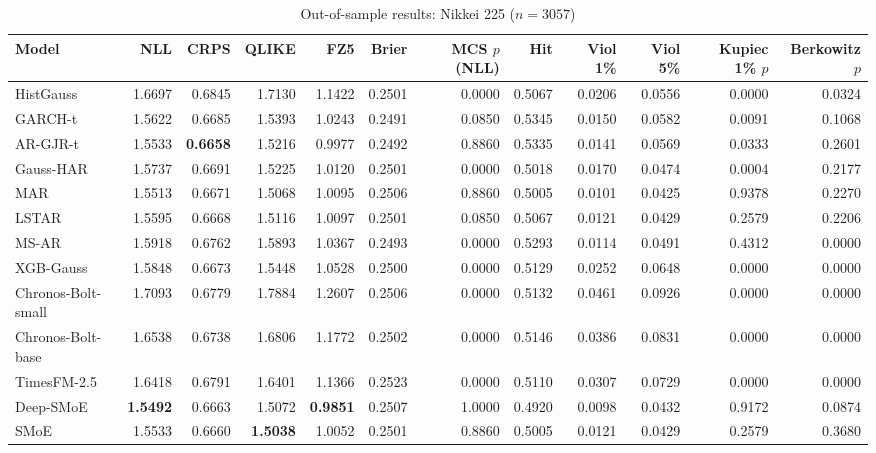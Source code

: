 \begin{table}[!htbp]\centering\scriptsize
\caption{Out-of-sample results: Nikkei 225 ($n=3057$)}\label{tab:asset_n225}
\begin{adjustbox}{max width=\textwidth}
\begin{tabular}{lrrrrrrrrrrr}
\toprule
Model & NLL & CRPS & QLIKE & FZ5 & Brier & MCS $p$ (NLL) & Hit & Viol 1\% & Viol 5\% & Kupiec 1\% $p$ & Berkowitz $p$\\
\midrule
HistGauss & 1.6697 & 0.6845 & 1.7130 & 1.1422 & 0.2501 & 0.0000 & 0.5067 & 0.0206 & 0.0556 & 0.0000 & 0.0324\\
GARCH-t & 1.5622 & 0.6685 & 1.5393 & 1.0243 & 0.2491 & 0.0850 & 0.5345 & 0.0150 & 0.0582 & 0.0091 & 0.1068\\
AR-GJR-t & 1.5533 & \textbf{0.6658} & 1.5216 & 0.9977 & 0.2492 & 0.8860 & 0.5335 & 0.0141 & 0.0569 & 0.0333 & 0.2601\\
Gauss-HAR & 1.5737 & 0.6691 & 1.5225 & 1.0120 & 0.2501 & 0.0000 & 0.5018 & 0.0170 & 0.0474 & 0.0004 & 0.2177\\
MAR & 1.5513 & 0.6671 & 1.5068 & 1.0095 & 0.2506 & 0.8860 & 0.5005 & 0.0101 & 0.0425 & 0.9378 & 0.2270\\
LSTAR & 1.5595 & 0.6668 & 1.5116 & 1.0097 & 0.2501 & 0.0850 & 0.5067 & 0.0121 & 0.0429 & 0.2579 & 0.2206\\
MS-AR & 1.5918 & 0.6762 & 1.5893 & 1.0367 & 0.2493 & 0.0000 & 0.5293 & 0.0114 & 0.0491 & 0.4312 & 0.0000\\
XGB-Gauss & 1.5848 & 0.6673 & 1.5448 & 1.0528 & 0.2500 & 0.0000 & 0.5129 & 0.0252 & 0.0648 & 0.0000 & 0.0000\\
Chronos-Bolt-small & 1.7093 & 0.6779 & 1.7884 & 1.2607 & 0.2506 & 0.0000 & 0.5132 & 0.0461 & 0.0926 & 0.0000 & 0.0000\\
Chronos-Bolt-base & 1.6538 & 0.6738 & 1.6806 & 1.1772 & 0.2502 & 0.0000 & 0.5146 & 0.0386 & 0.0831 & 0.0000 & 0.0000\\
TimesFM-2.5 & 1.6418 & 0.6791 & 1.6401 & 1.1366 & 0.2523 & 0.0000 & 0.5110 & 0.0307 & 0.0729 & 0.0000 & 0.0000\\
Deep-SMoE & \textbf{1.5492} & 0.6663 & 1.5072 & \textbf{0.9851} & 0.2507 & 1.0000 & 0.4920 & 0.0098 & 0.0432 & 0.9172 & 0.0874\\
SMoE & 1.5533 & 0.6660 & \textbf{1.5038} & 1.0052 & 0.2501 & 0.8860 & 0.5005 & 0.0121 & 0.0429 & 0.2579 & 0.3680\\
\bottomrule
\end{tabular}
\end{adjustbox}
\end{table}